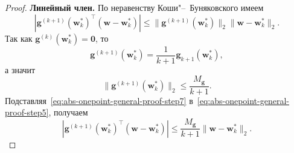 \begin{proof}
    \textbf{Линейный член.}
    По неравенству Коши"--~Буняковского имеем
    \begin{equation}
        \label{eq:abs-onepoint-general-proof-step5}
        \left|
            \mathbf g^{(k+1)}(\mathbf w_k^*)^\top
            (\mathbf w-\mathbf w_k^*)
        \right|
        \leqslant
        \|\mathbf g^{(k+1)}(\mathbf w_k^*)\|_2
        \|\mathbf w-\mathbf w_k^*\|_2.
    \end{equation}
    Так как $\mathbf g^{(k)}(\mathbf w_k^*)=\mathbf 0$, то
    \begin{equation}
        \label{eq:abs-onepoint-general-proof-step6}
        \mathbf g^{(k+1)}(\mathbf w_k^*)
        =
        \frac{1}{k+1}
        \mathbf g_{k+1}(\mathbf w_k^*),
    \end{equation}
    а значит
    \begin{equation}
        \label{eq:abs-onepoint-general-proof-step7}
        \|\mathbf g^{(k+1)}(\mathbf w_k^*)\|_2
        \leqslant
        \frac{M_{\mathbf g}}{k+1}.
    \end{equation}
    Подставляя~\eqref{eq:abs-onepoint-general-proof-step7}
    в~\eqref{eq:abs-onepoint-general-proof-step5}, получаем
    \begin{equation}
        \label{eq:abs-onepoint-general-proof-step8}
        \left|
            \mathbf g^{(k+1)}(\mathbf w_k^*)^\top
            (\mathbf w-\mathbf w_k^*)
        \right|
        \leqslant
        \frac{M_{\mathbf g}}{k+1}
        \|\mathbf w-\mathbf w_k^*\|_2.
    \end{equation}


\end{proof}
